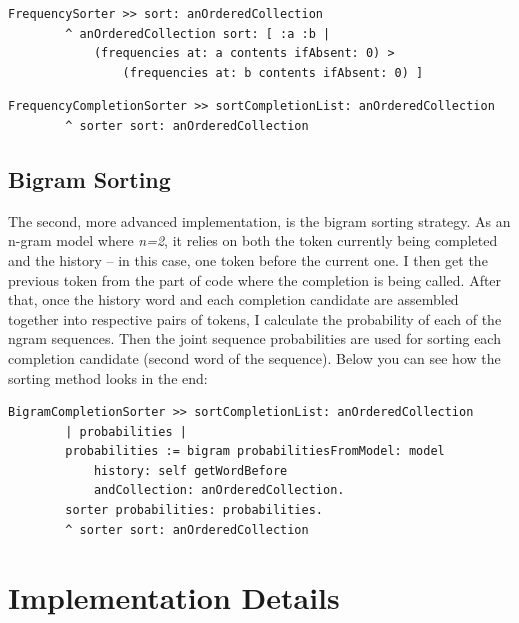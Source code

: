 \begin{lstlisting}[caption={The sorter implementation: sorting the candidates according to their frequencies}, label={lst:unigramCode2}]
    FrequencySorter >> sort: anOrderedCollection
        ^ anOrderedCollection sort: [ :a :b |
            (frequencies at: a contents ifAbsent: 0) >
                (frequencies at: b contents ifAbsent: 0) ]
\end{lstlisting}

\begin{lstlisting}[caption={The unigram sorter implementation: returning the results sorted in the code above}, label={lst:unigramCode3}]
    FrequencyCompletionSorter >> sortCompletionList: anOrderedCollection
        ^ sorter sort: anOrderedCollection
\end{lstlisting}

\subsection{Bigram Sorting}
The second, more advanced implementation, is the bigram sorting strategy. As an n-gram model where \textit{n=2}, it relies on both the token currently being completed and the history -- in this case, one token before the current one. I then get the previous token from the part of code where the completion is being called. After that, once the history word and each completion candidate are assembled together into respective pairs of tokens, I calculate the probability of each of the ngram sequences. Then the joint sequence probabilities are used for sorting each completion candidate (second word of the sequence). Below you can see how the sorting method looks in the end:

\begin{lstlisting}[caption={The bigram sorter implementation: receives the list of completions, gets the word before from context, trains the model, and sorts the completions based on sequence probabilities}, label={lst:bigramCode}]
    BigramCompletionSorter >> sortCompletionList: anOrderedCollection
        | probabilities |
        probabilities := bigram probabilitiesFromModel: model
            history: self getWordBefore
            andCollection: anOrderedCollection.
        sorter probabilities: probabilities.
        ^ sorter sort: anOrderedCollection
\end{lstlisting}

\section{Implementation Details}
\label{sec:ProposedSolution-Implementation}
